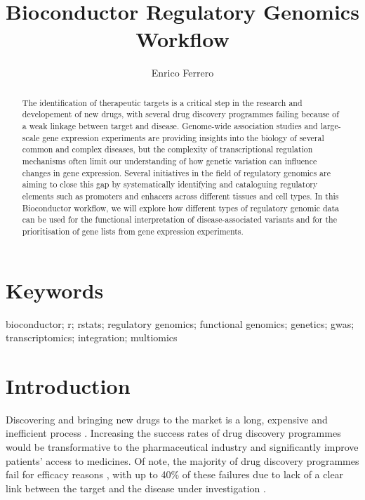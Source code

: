 \documentclass[9pt,a4paper,]{extarticle}
\begin{document}
\pagestyle{front}

\title{Bioconductor Regulatory Genomics Workflow}

\author{Enrico Ferrero}

\maketitle
\thispagestyle{front}

\begin{abstract}
The identification of therapeutic targets is a critical step in the research and developement of new drugs, with several drug discovery programmes failing because of a weak linkage between target and disease. Genome-wide association studies and large-scale gene expression experiments are providing insights into the biology of several common and complex diseases, but the complexity of transcriptional regulation mechanisms often limit our understanding of how genetic variation can influence changes in gene expression. Several initiatives in the field of regulatory genomics are aiming to close this gap by systematically identifying and cataloguing regulatory elements such as promoters and enhacers across different tissues and cell types. In this Bioconductor workflow, we will explore how different types of regulatory genomic data can be used for the functional interpretation of disease-associated variants and for the prioritisation of gene lists from gene expression experiments.
\end{abstract}

\section*{Keywords}
bioconductor; r; rstats; regulatory genomics; functional genomics; genetics; gwas; transcriptomics; integration; multiomics


\clearpage
\pagestyle{main}

\section{Introduction}\label{introduction}

Discovering and bringing new drugs to the market is a long, expensive and inefficient process \citep{Waring2015, DiMasi2016}.
Increasing the success rates of drug discovery programmes would be transformative to the pharmaceutical industry and significantly improve patients' access to medicines.
Of note, the majority of drug discovery programmes fail for efficacy reasons \citep{Harrison2016}, with up to 40\% of these failures due to lack of a clear link between the target and the disease under investigation \citep{Cook2014}.
\end{document}
